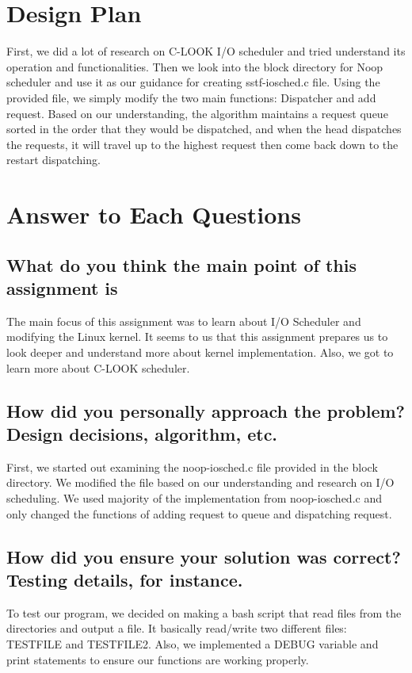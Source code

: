 \documentclass[onecolumn, draftclsnofoot,10pt, compsoc]{IEEEtran}
\begin{document}

\section{Design Plan}
\noindent
First, we did a lot of research on C-LOOK I/O scheduler and tried understand its operation and functionalities. Then we look into the block directory for Noop scheduler and use it as our guidance for creating sstf-iosched.c file. Using the provided file, we simply modify the two main functions: Dispatcher and add request. Based on our understanding, the algorithm maintains a request queue sorted in the order that they would be dispatched, and when the head dispatches the requests, it will travel up to the highest request then come back down to the restart dispatching. 
\\

\section{Answer to Each Questions }
\subsection{What do you think the main point of this assignment is}

\noindent 
The main focus of this assignment was to learn about I/O Scheduler and modifying the Linux kernel. It seems to us that this assignment prepares us to look deeper and understand more about kernel implementation. Also, we got to learn more about C-LOOK scheduler.  
\\

\subsection{How did you personally approach the problem? Design decisions, algorithm, etc.}

\noindent 
First, we started out examining the noop-iosched.c file provided in the block directory. We modified the file based on our understanding and research on I/O scheduling. We used majority of the implementation from noop-iosched.c and only changed the functions of adding request to queue and dispatching request. 
\\

\subsection{How did you ensure your solution was correct? Testing details, for instance.}
\noindent 
To test our program, we decided on making a bash script that read files from the directories and output a file. It basically read/write two different files: TESTFILE and TESTFILE2. Also, we implemented a DEBUG variable and print statements to ensure our functions are working properly.  
\\
\end{document}
